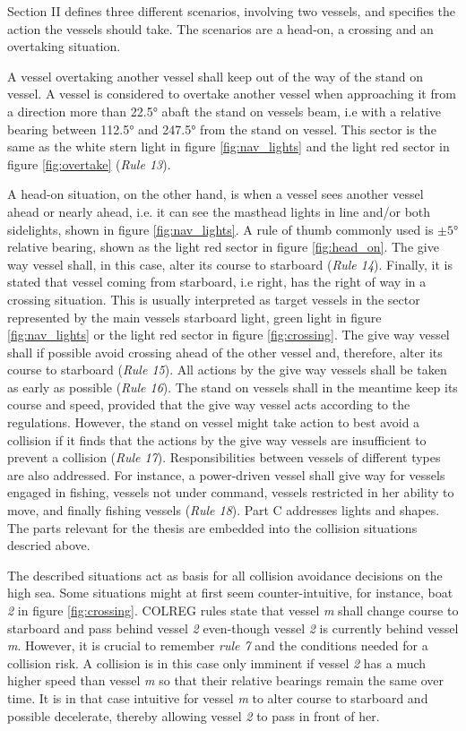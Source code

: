 Section II defines three different scenarios, involving two vessels, and specifies the action the vessels should take.
The scenarios are a head-on, a crossing and an overtaking situation.

A vessel overtaking another vessel shall keep out of the way of the stand on vessel.
A vessel is considered to overtake another vessel when approaching it from a direction more than \ang{22.5} abaft the stand on vessels beam, i.e with a relative bearing between \ang{112.5} and \ang{247.5} from the stand on vessel.
This sector is the same as the white stern light in  figure \ref{fig:nav_lights} and{} the light red sector in figure \ref{fig:overtake} (\textit{Rule 13}).

A head-on situation, on the other hand, is when a vessel sees another vessel ahead or nearly ahead, i.e. it can see the masthead lights in line and/or both sidelights, shown in figure \ref{fig:nav_lights}. A rule of thumb commonly used is $\pm\ang{5}$ relative bearing, shown as the light red sector in figure \ref{fig:head_on}.
The give way vessel shall, in this case, alter its course to starboard (\textit{Rule 14}).
Finally, it is stated that vessel coming from starboard, i.e right, has the right of way in a crossing situation.
This is usually interpreted as target  vessels in the sector represented by the main vessels starboard light, green light in figure \ref{fig:nav_lights} or the light red sector in figure \ref{fig:crossing}.
The give way vessel shall if possible avoid crossing ahead of the other vessel and, therefore, alter its course to starboard  (\textit{Rule 15}).
All actions by the give way vessels shall be taken as early as possible  (\textit{Rule 16}). The stand on vessels shall in the meantime keep its course and speed, provided that the give way vessel acts according to the regulations.
However, the stand on vessel might take action to best avoid a collision if it finds that the actions by the give way vessels are insufficient to prevent a collision  (\textit{Rule 17}).
Responsibilities between vessels of different types are also addressed.
For instance, a power-driven vessel shall give way for vessels engaged in fishing,  vessels not under command,  vessels restricted in her ability to move, and finally fishing vessels   (\textit{Rule 18}).
Part C addresses lights and shapes. The parts relevant for the thesis are embedded into the collision situations descried above. 

The described situations act as basis for all collision avoidance decisions on the high sea. Some situations might at first seem counter-intuitive, for instance, boat \textit{2} in figure \ref{fig:crossing}. COLREG rules state that vessel \textit{m} shall change course to starboard and pass behind vessel \textit{2} even-though vessel \textit{2} is currently behind vessel \textit{m}. However, it is crucial to remember \textit{rule 7} and the conditions needed for a collision risk. A collision is in this case only imminent if vessel \textit{2} has a much higher speed than vessel \textit{m} so that their relative bearings remain the same over time. It is in that case intuitive for vessel \textit{m} to alter course to starboard and possible decelerate, thereby allowing vessel \textit{2} to pass in front of her.

